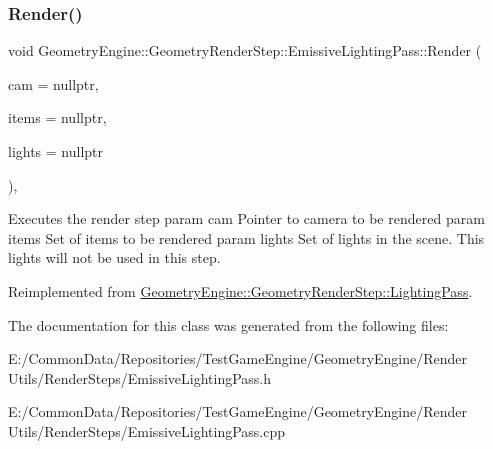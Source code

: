 \subsubsection{\texorpdfstring{Render()}{Render()}}
{\footnotesize\ttfamily void Geometry\+Engine\+::\+Geometry\+Render\+Step\+::\+Emissive\+Lighting\+Pass\+::\+Render (\begin{DoxyParamCaption}\item[{\mbox{\hyperlink{class_geometry_engine_1_1_geometry_world_item_1_1_geometry_camera_1_1_camera}{Geometry\+World\+Item\+::\+Geometry\+Camera\+::\+Camera}} $\ast$}]{cam = {\ttfamily nullptr},  }\item[{std\+::unordered\+\_\+set$<$ \mbox{\hyperlink{class_geometry_engine_1_1_geometry_world_item_1_1_geometry_item_1_1_geometry_item}{Geometry\+World\+Item\+::\+Geometry\+Item\+::\+Geometry\+Item}} $\ast$ $>$ $\ast$}]{items = {\ttfamily nullptr},  }\item[{std\+::unordered\+\_\+set$<$ \mbox{\hyperlink{class_geometry_engine_1_1_geometry_world_item_1_1_geometry_light_1_1_light}{Geometry\+World\+Item\+::\+Geometry\+Light\+::\+Light}} $\ast$ $>$ $\ast$}]{lights = {\ttfamily nullptr} }\end{DoxyParamCaption})\hspace{0.3cm}{\ttfamily [override]}, {\ttfamily [virtual]}}

Executes the render step param cam Pointer to camera to be rendered param items Set of items to be rendered param lights Set of lights in the scene. This lights will not be used in this step. 

Reimplemented from \mbox{\hyperlink{class_geometry_engine_1_1_geometry_render_step_1_1_lighting_pass_ae6d9fa99f67e659839ca310947787f52}{Geometry\+Engine\+::\+Geometry\+Render\+Step\+::\+Lighting\+Pass}}.



The documentation for this class was generated from the following files\+:\begin{DoxyCompactItemize}
\item 
E\+:/\+Common\+Data/\+Repositories/\+Test\+Game\+Engine/\+Geometry\+Engine/\+Render Utils/\+Render\+Steps/Emissive\+Lighting\+Pass.\+h\item 
E\+:/\+Common\+Data/\+Repositories/\+Test\+Game\+Engine/\+Geometry\+Engine/\+Render Utils/\+Render\+Steps/Emissive\+Lighting\+Pass.\+cpp\end{DoxyCompactItemize}
